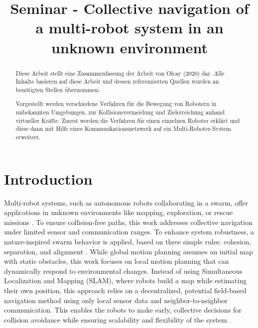 \documentclass[conference]{IEEEtran}
\begin{document}
\title{Seminar - Collective navigation of a multi-robot system in an unknown environment}
\author{
}

\maketitle


\begin{abstract}
Diese Arbeit stellt eine Zusammenfassung der Arbeit von Olcay (2020) dar. Alle Inhalte basieren
auf diese Arbeit \cite{Olcay.2020} und dessen referenzierten Quellen wurden 
an benötigten Stellen übernommen.

Vorgestellt werden verschiedene Verfahren für die Bewegung von Robotern in unbekannten Umgebungen,
zur Kollisionsvermeidung und Zielerreichung anhand virtueller Kräfte. Zuerst werden die Verfahren
für einen einzelnen Roboter erklärt und diese dann mit Hilfe eines Kommunikationsnetzwerk auf 
ein Multi-Roboter-System erweitert.
\end{abstract}

\section{Introduction}
Multi-robot systems, such as autonomous robots collaborating in a swarm, 
offer applications in unknown environments like mapping, exploration, or 
rescue missions \cite{Stormont.null}. 
To ensure collision-free paths, this work addresses 
collective navigation under limited sensor and communication ranges. To 
enhance system robustness, a nature-inspired swarm behavior is applied, 
based on three simple rules: cohesion, separation, and alignment 
\cite{Reynolds.1987}. 
While global motion planning assumes an initial map with static obstacles, 
this work focuses on local motion planning that can dynamically respond 
to environmental changes. Instead of using Simultaneous Localization and 
Mapping (SLAM), where robots build a map while estimating their own 
position, this approach relies on a decentralized, potential field-based 
navigation method using only local sensor data and neighbor-to-neighbor 
communication. This enables the robots to make early, collective decisions 
for collision avoidance while ensuring scalability and flexibility of 
the system.
\end{document}
